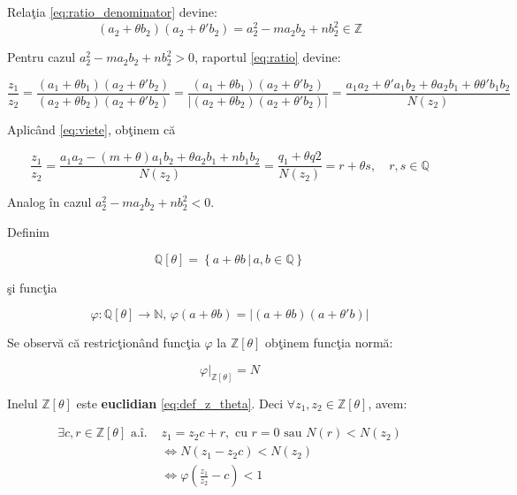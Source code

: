 \documentclass[12pt]{article}
\begin{document}
Relaţia \eqref{eq:ratio_denominator} devine:
\begin{equation}
    (a_2 + \theta b_2)(a_2 + \theta' b_2) = a_2^2 - m a_2 b_2 + n b_2^2 \in \mathbb{Z}
\end{equation}

Pentru cazul $a_2^2 - m a_2 b_2 + n b_2^2 > 0$, raportul \eqref{eq:ratio} devine:

\begin{equation} \label{eq:ratio_a}
    \frac{z_1}{z_2} = \frac{(a_1 + \theta b_1)(a_2 + \theta' b_2)}{(a_2 + \theta b_2)(a_2 + \theta' b_2)} 
    =  \frac{(a_1 + \theta b_1)(a_2 + \theta' b_2)}{|(a_2 + \theta b_2)(a_2 + \theta' b_2)|} 
    = \frac{a_1 a_2 + \theta' a_1 b_2 + \theta a_2 b_1 + \theta \theta' b_1b_2}{N(z_2)}
\end{equation}

Aplicând \eqref{eq:viete}, obţinem că

\begin{equation} \label{eq:ratio_a_viete}
    \frac{z_1}{z_2} =
    \frac{a_1 a_2 - (m + \theta) a_1 b_2 + \theta a_2 b_1 + n b_1b_2}{N(z_2)} =
    \frac{q_1 + \theta q2}{N(z_2)} = 
    r + \theta s, \quad r, s \in \mathbb{Q}
\end{equation}

Analog în cazul $a_2^2 - m a_2 b_2 + n b_2^2 < 0$.

Definim

\begin{equation} \label{eq:def_q_theta}
    \mathbb{Q}[\theta] = \left\{ a + \theta b \,|\, a, b \in \mathbb{Q} \right\}
\end{equation}

şi funcţia

\begin{equation} \label{eq:def_phi}
    \varphi : \mathbb{Q}[\theta] \to \mathbb{N}, \, \varphi(a + \theta b) = |(a + \theta b)(a + \theta' b)|
\end{equation}

Se observă că restricţionând funcţia $\varphi$ la $\mathbb{Z}[\theta]$ obţinem funcţia normă:

\begin{equation} \label{eq:phi_restricted_z}
    \left.\varphi\right|_{\mathbb{Z}[\theta]} = N
\end{equation}

Inelul $\mathbb{Z}[\theta]$ este \textbf{euclidian} \eqref{eq:def_z_theta}. Deci $\forall z_1, z_2 \in \mathbb{Z}[\theta] $, avem:

\begin{equation} \label{eq:z_theta_euclidean}
    \begin{split}
        \exists c, r \in \mathbb{Z}[\theta] \text{ a.î. }
        & z_1 = z_2 c + r, \text{ cu } r = 0 \text{ sau } N(r) < N(z_2) \\
        &\Leftrightarrow N(z_1 - z_2 c) < N(z_2) \\
        &\Leftrightarrow \varphi \left(\frac{z_1}{z_2} - c\right) < 1
    \end{split}
\end{equation}
\end{document}
